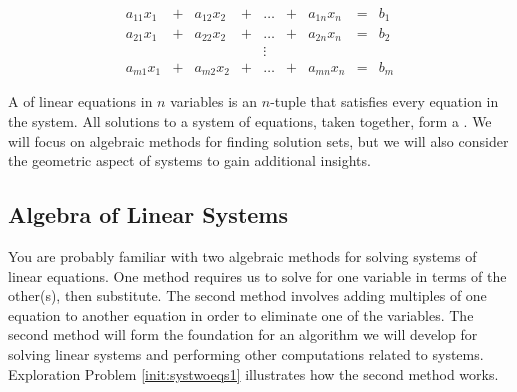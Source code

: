 \documentclass{ximera}
\begin{document}
$$\begin{array}{ccccccccc}
      a_{11}x_1 &+ &a_{12}x_2&+&\ldots&+&a_{1n}x_n&= &b_1 \\
	 a_{21}x_1 &+ &a_{22}x_2&+&\ldots&+&a_{2n}x_n&= &b_2 \\
     &&&&\vdots&&&& \\
     a_{m1}x_1 &+ &a_{m2}x_2&+&\ldots&+&a_{mn}x_n&= &b_m
    \end{array}$$


A  of linear equations in $n$ variables is an $n$-tuple that satisfies every equation in  the system.  All solutions to a system of equations, taken together, form a .
We will focus on algebraic methods for finding solution sets, but we will also consider the geometric aspect of systems to gain additional insights.

\subsection*{Algebra of Linear Systems}

You are probably familiar with two algebraic methods for solving systems of linear equations.  One method requires us to solve for one variable in terms of the other(s), then substitute.  The second method involves adding multiples of one equation to another equation in order to eliminate one of the variables.  The second method will form the foundation for an algorithm we will develop for solving linear systems and performing other computations related to systems.  Exploration Problem \ref{init:systwoeqs1} illustrates how the second method works.
\end{document}
